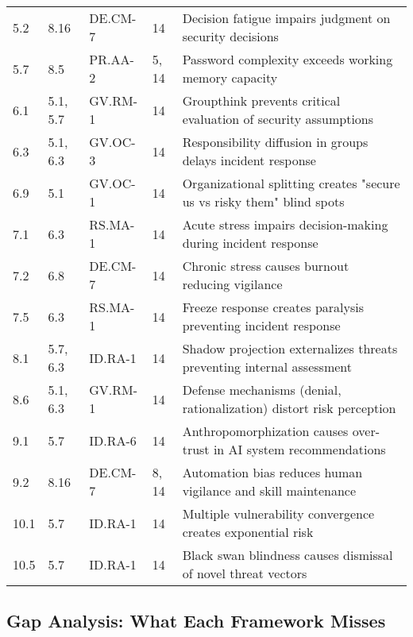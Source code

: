\documentclass[11pt,a4paper]{article}
\begin{document}
\begin{longtable}{p{1.5cm}p{3cm}p{3cm}p{2.5cm}p{4cm}}
5.2 & 8.16 & DE.CM-7 & 14 & Decision fatigue impairs judgment on security decisions \\

5.7 & 8.5 & PR.AA-2 & 5, 14 & Password complexity exceeds working memory capacity \\

6.1 & 5.1, 5.7 & GV.RM-1 & 14 & Groupthink prevents critical evaluation of security assumptions \\

6.3 & 5.1, 6.3 & GV.OC-3 & 14 & Responsibility diffusion in groups delays incident response \\

6.9 & 5.1 & GV.OC-1 & 14 & Organizational splitting creates "secure us vs risky them" blind spots \\

7.1 & 6.3 & RS.MA-1 & 14 & Acute stress impairs decision-making during incident response \\

7.2 & 6.8 & DE.CM-7 & 14 & Chronic stress causes burnout reducing vigilance \\

7.5 & 6.3 & RS.MA-1 & 14 & Freeze response creates paralysis preventing incident response \\

8.1 & 5.7, 6.3 & ID.RA-1 & 14 & Shadow projection externalizes threats preventing internal assessment \\

8.6 & 5.1, 6.3 & GV.RM-1 & 14 & Defense mechanisms (denial, rationalization) distort risk perception \\

9.1 & 5.7 & ID.RA-6 & 14 & Anthropomorphization causes over-trust in AI system recommendations \\

9.2 & 8.16 & DE.CM-7 & 8, 14 & Automation bias reduces human vigilance and skill maintenance \\

10.1 & 5.7 & ID.RA-1 & 14 & Multiple vulnerability convergence creates exponential risk \\

10.5 & 5.7 & ID.RA-1 & 14 & Black swan blindness causes dismissal of novel threat vectors \\

\end{longtable}

\subsection{Gap Analysis: What Each Framework Misses}
\end{document}
